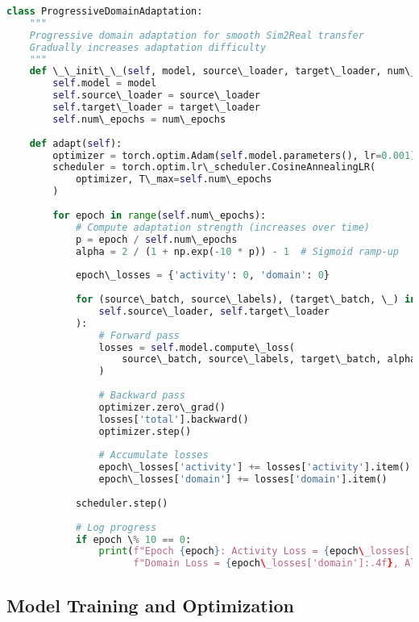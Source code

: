 \documentclass[journal]{IEEEtran}
\begin{document}
\begin{lstlisting}[language=Python, caption=Progressive Domain Adaptation Strategy]
class ProgressiveDomainAdaptation:
    """
    Progressive domain adaptation for smooth Sim2Real transfer
    Gradually increases adaptation difficulty
    """
    def \_\_init\_\_(self, model, source\_loader, target\_loader, num\_epochs=100):
        self.model = model
        self.source\_loader = source\_loader
        self.target\_loader = target\_loader
        self.num\_epochs = num\_epochs
        
    def adapt(self):
        optimizer = torch.optim.Adam(self.model.parameters(), lr=0.001)
        scheduler = torch.optim.lr\_scheduler.CosineAnnealingLR(
            optimizer, T\_max=self.num\_epochs
        )
        
        for epoch in range(self.num\_epochs):
            # Compute adaptation strength (increases over time)
            p = epoch / self.num\_epochs
            alpha = 2 / (1 + np.exp(-10 * p)) - 1  # Sigmoid ramp-up
            
            epoch\_losses = {'activity': 0, 'domain': 0}
            
            for (source\_batch, source\_labels), (target\_batch, \_) in zip(
                self.source\_loader, self.target\_loader
            ):
                # Forward pass
                losses = self.model.compute\_loss(
                    source\_batch, source\_labels, target\_batch, alpha
                )
                
                # Backward pass
                optimizer.zero\_grad()
                losses['total'].backward()
                optimizer.step()
                
                # Accumulate losses
                epoch\_losses['activity'] += losses['activity'].item()
                epoch\_losses['domain'] += losses['domain'].item()
            
            scheduler.step()
            
            # Log progress
            if epoch \% 10 == 0:
                print(f"Epoch {epoch}: Activity Loss = {epoch\_losses['activity']:.4f}, "
                      f"Domain Loss = {epoch\_losses['domain']:.4f}, Alpha = {alpha:.3f}")
\end{lstlisting}

\subsection{Model Training and Optimization}
\end{document}
